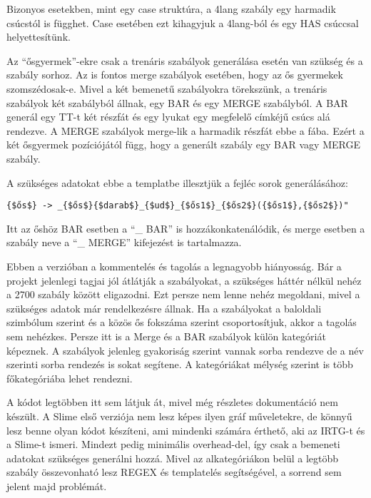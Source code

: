 Bizonyos esetekben, mint egy case struktúra, a 4lang szabály egy harmadik csúcstól is függhet. Case esetében ezt kihagyjuk a 4lang-ból és egy HAS csúccsal helyettesítünk.

Az “ősgyermek”-ekre csak a trenáris szabályok generálása esetén van szükség és a szabály sorhoz. Az is fontos merge szabályok esetében, hogy az ős gyermekek szomszédosak-e. Mivel a két bemenetű szabályokra törekszünk, a trenáris szabályok két szabályból állnak, egy BAR és egy MERGE szabályból. A BAR generál egy TT-t két részfát és egy lyukat egy megfelelő címkéjű csúcs alá rendezve. A MERGE szabályok merge-lik a harmadik részfát ebbe a fába. Ezért a két ősgyermek pozíciójától függ, hogy a generált szabály egy BAR vagy MERGE szabály.

A szükséges adatokat ebbe a templatbe illesztjük a fejléc sorok generálásához:

\begin{verbatim}
{$ős$} -> _{$ős$}{$darab$}_{$ud$}_{$ős1$}_{$ős2$}({$ős1$},{$ős2$})"
\end{verbatim}

Itt az őshöz BAR esetben a “\_ BAR” is hozzákonkatenálódik, és merge esetben a szabály neve a “\_ MERGE” kifejezést is tartalmazza.

Ebben a verzióban a kommentelés és tagolás a legnagyobb hiányosság. Bár a projekt jelenlegi tagjai jól átlátják a szabályokat, a szükséges háttér nélkül nehéz a 2700 szabály között eligazodni. Ezt persze nem lenne nehéz megoldani, mivel a szükséges adatok már rendelkezésre állnak. Ha a szabályokat a baloldali szimbólum szerint és a közös ős fokszáma szerint csoportosítjuk, akkor a tagolás sem nehézkes. Persze itt is a Merge és a BAR szabályok külön kategóriát képeznek. A szabályok jelenleg gyakoriság szerint vannak sorba rendezve de a név szerinti sorba rendezés is sokat segítene. A kategóriákat mélység szerint is több főkategóriába lehet rendezni.

A kódot legtöbben itt sem látjuk át, mivel még részletes dokumentáció nem készült. A Slime első verziója nem lesz képes ilyen gráf műveletekre, de könnyű lesz benne olyan kódot készíteni, ami mindenki számára érthető, aki az IRTG-t és a Slime-t ismeri. Mindezt pedig minimális overhead-del, így csak a bemeneti adatokat szükséges generálni hozzá. Mivel az alkategóriákon belül a legtöbb szabály összevonható lesz REGEX és templatelés segítségével, a sorrend sem jelent majd problémát.